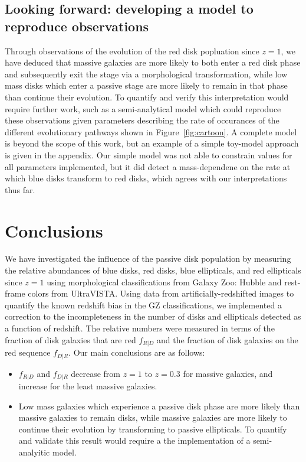 \documentclass[useAMS,usenatbib]{mn2e}
\begin{document}
\subsection{Looking forward: developing a model to reproduce observations}

Through observations of the evolution of the red disk popluation since $z=1$, we have deduced that massive galaxies are more likely to both enter a red disk phase and subsequently exit the stage via a morphological transformation, while low mass disks which enter a passive stage are more likely to remain in that phase than continue their evolution. To quantify and verify this interpretation would require further work, such as a semi-analytical model which could reproduce these observations given parameters describing the rate of occurances of the different evolutionary pathways shown in Figure~\ref{fig:cartoon}. A complete model is beyond the scope of this work, but an example of a simple toy-model approach is given in the appendix. Our simple model was not able to constrain values for all parameters implemented, but it did detect a mass-dependene on the rate at which blue disks transform to red disks, which agrees with our interpretations thus far. 

\section{Conclusions}
\label{sec:conclusions}

We have investigated the influence of the passive disk population by measuring the relative abundances of blue disks, red disks, blue ellipticals, and red ellipticals since $z=1$ using morphological classifications from Galaxy Zoo: Hubble and rest-frame colors from UltraVISTA. Using data from artificially-redshifted  images to quantify the known redshift bias in the GZ classifications, we implemented a correction to the incompleteness in the number of disks and ellipticals detected as a function of redshift. The relative numbers were measured in terms of the fraction of disk galaxies that are red $f_{R|D}$ and the fraction of disk galaxies on the red sequence $f_{D|R}$. Our main conclusions are as follows:

\begin{itemize}

\item{$f_{R|D}$ and $f_{D|R}$ decrease from $z=1$ to $z=0.3$ for massive galaxies, and increase for the least massive galaxies.}

\item{Low mass galaxies which experience a passive disk phase are more likely than massive galaxies to remain disks, while massive galaxies are more likely to continue their evolution by transforming to passive ellipticals. To quantify and validate this result would require a the implementation of a semi-analyitic model.}


\end{itemize}
\end{document}
